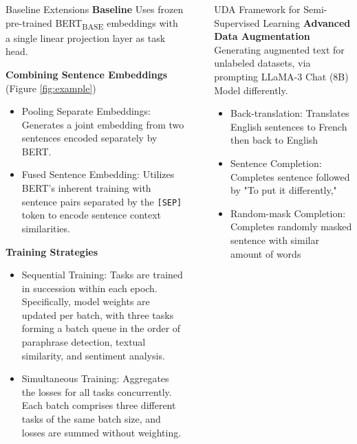\documentclass[final]{beamer}
\newlength{\sepwidth}
\newlength{\colwidth}
\newcommand{\separatorcolumn}{\begin{column}{\sepwidth}\end{column}}
\begin{document}
\begin{frame}[t]
\begin{columns}[t]
\begin{column}{\colwidth}
\begin{block}{Baseline Extensions}
    \textbf{Baseline} Uses frozen pre-trained BERT\textsubscript{BASE} embeddings with a single linear projection layer as task head.

    \textbf{Combining Sentence Embeddings} (Figure \ref{fig:example})
    \begin{itemize}
        \item {Pooling Separate Embeddings:} Generates a joint embedding from two sentences encoded separately by BERT.
        \item {Fused Sentence Embedding:} Utilizes BERT's inherent training 
        with sentence pairs separated by the \texttt{[SEP]} token to encode sentence context 
        similarities.
    \end{itemize} 

    \textbf{Training Strategies}
    \begin{itemize}
        \item {Sequential Training:} Tasks are trained in succession 
        within each epoch. Specifically, model weights are updated per batch, with three tasks 
        forming a batch queue in the order of paraphrase detection, textual similarity, and 
        sentiment analysis.
        \item {Simultaneous Training:} Aggregates the losses for all tasks concurrently. 
        Each batch comprises three different tasks of the same batch size, and losses are 
        summed without weighting.
    \end{itemize}
    
  \end{block}


\end{column}

\separatorcolumn

\begin{column}{\colwidth}

    \begin{block}{UDA Framework for Semi-Supervised Learning}
        \textbf{Advanced Data Augmentation} Generating augmented text for unlabeled datasets,
        via prompting LLaMA-3 Chat (8B) Model differently.
        \begin{itemize}
            \item Back-translation: Translates English sentences to French then back to English
            \item Sentence Completion: Completes sentence followed by "To put it differently,"
            \item Random-mask Completion: Completes randomly masked sentence with similar amount
            of words
        \end{itemize}


\end{block}
\end{column}
\end{columns}
\end{frame}
\end{document}
